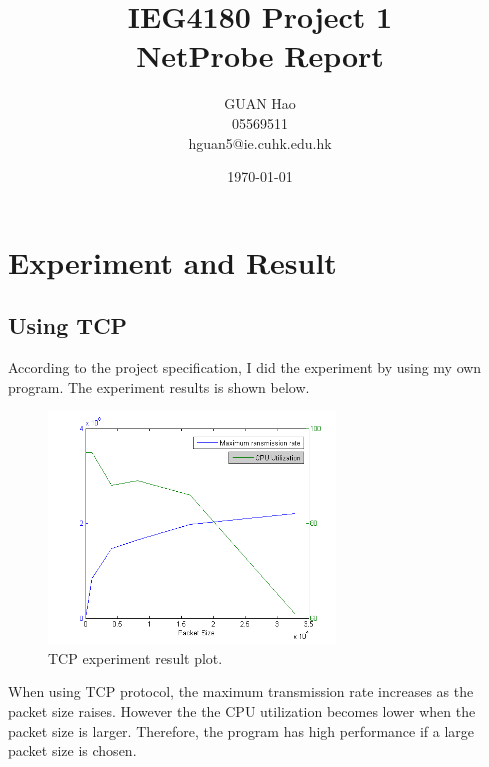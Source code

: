 \documentclass[11pt]{article}
\title{IEG4180 Project 1\\NetProbe Report}
\author{GUAN Hao\\05569511\\hguan5@ie.cuhk.edu.hk}
\date{\today}
\begin{document}
\maketitle
\section{Experiment and Result}
\subsection{Using TCP}
According to the project specification, I did the experiment by using my own program. The experiment results is shown below.

\begin{figure}
\centering
\includegraphics[width=3in]{TCP.png}
\caption{TCP experiment result plot.}
\label{fig:TCP}
\end{figure}
When using TCP protocol, the maximum transmission rate increases as the packet size raises. However the the CPU utilization becomes lower when the packet size is larger. Therefore, the program has high performance if a large packet size is chosen.
\end{document}
